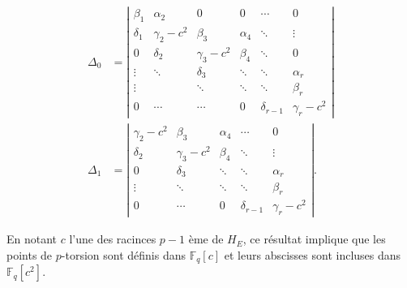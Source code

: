 \documentclass[10pt,a4paper]{book}
\theoremstyle{plain}
\theoremstyle{definition}
\theoremstyle{definition}
\theoremstyle{definition}
\theoremstyle{definition}
\theoremstyle{remark}
\theoremstyle{remark}
\theoremstyle{definition}
\begin{document}
\begin{equation*}
\begin{alignedat}{1}
\Delta_0 &=\left| 
\begin{matrix}
\beta_1 & \alpha_2 & 0 & 0 & \cdots & 0\\
\delta_1 & \gamma_2 - c^2 & \beta_3 & \alpha_4 & \ddots & \vdots \\
0 & \delta_2 & \gamma_3 - c^2 & \beta_4 & \ddots & 0 \\
\vdots & \ddots & \delta_3 & \ddots & \ddots & \alpha_r \\
\vdots & & \ddots  & \ddots & \ddots & \beta_r \\
0 & \cdots & \cdots & 0 & \delta_{r-1} & \gamma_r - c^2 
\end{matrix}
\right| \\
\Delta_1 &= \left| 
\begin{matrix}
\gamma_2-c^2 & \beta_3 & \alpha_4 & \cdots & 0 \\
\delta_2 & \gamma_3 - c^2 & \beta_4 & \ddots & \vdots \\
0 & \delta_3 & \ddots & \ddots & \alpha_r \\
\vdots & \ddots & \ddots & \ddots & \beta_r \\
0 & \cdots & 0 & \delta_{r-1} & \gamma_r-c^2
\end{matrix}
\right|.
\end{alignedat}
\end{equation*}


En notant $c$ l'une des racinces $p-1$ ème de $H_E$, ce résultat implique que les points de $p$-torsion sont définis dans $\mathbb{F}_q[c]$ et leurs abscisses sont incluses dans $\mathbb{F}_q[c^2]$.
\end{document}
